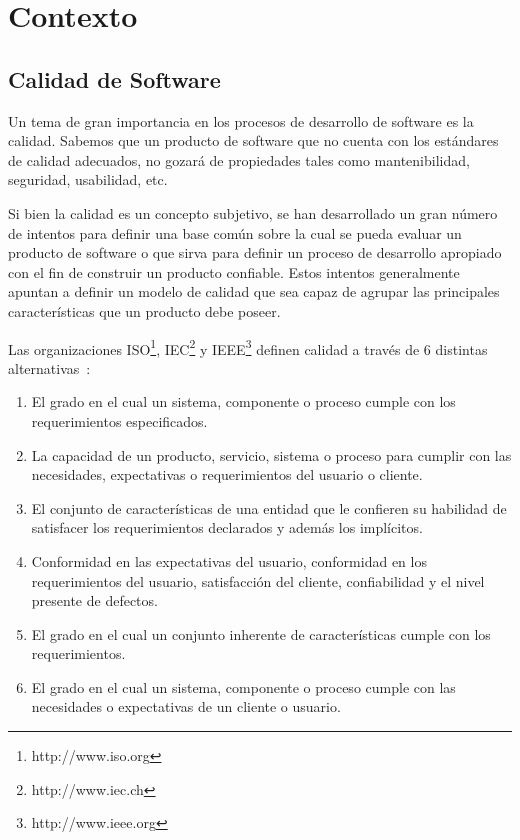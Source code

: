\chapter{Contexto}
\label{chap:contexto}
\section{Calidad de Software}
Un tema de gran importancia en los procesos de desarrollo de software es la calidad.
Sabemos que un producto de software que no cuenta con los estándares de
calidad adecuados, no gozará de propiedades tales como mantenibilidad, seguridad, 
usabilidad, etc.

Si bien la calidad es un concepto subjetivo, se han desarrollado un gran
número de intentos para definir una base común sobre la cual se pueda evaluar un producto 
de software o que sirva para definir un proceso de desarrollo apropiado con el fin de construir
un producto confiable. Estos intentos generalmente apuntan a definir un modelo
de calidad que sea capaz de agrupar las principales características que un producto debe poseer.

Las organizaciones ISO\footnote{http://www.iso.org}, IEC\footnote{http://www.iec.ch} y IEEE\footnote{http://www.ieee.org} 
definen calidad a través de 6 distintas alternativas~\cite{5276043}:
\begin{enumerate}
    \item El grado en el cual un sistema, componente o proceso cumple con los requerimientos especificados.
    \item La capacidad de un producto, servicio, sistema o proceso para cumplir con las necesidades, expectativas
    o requerimientos del usuario o cliente.
    \item El conjunto de características de una entidad que le confieren su habilidad de satisfacer los requerimientos
    declarados y además los implícitos.
    \item Conformidad en las expectativas del usuario, conformidad en los requerimientos del usuario, satisfacción del cliente,
    confiabilidad y el nivel presente de defectos.
    \item El grado en el cual un conjunto inherente de características cumple con los requerimientos.
    \item El grado en el cual un sistema, componente o proceso cumple con las necesidades o expectativas de un cliente o usuario.
\end{enumerate}

